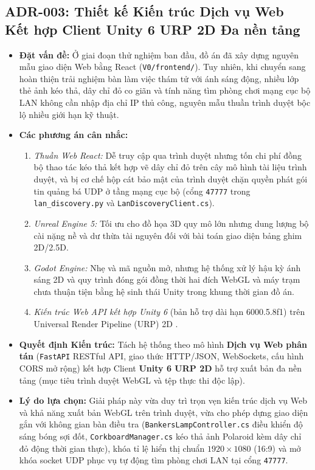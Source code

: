 \subsection{ADR-003: Thiết kế Kiến trúc Dịch vụ Web Kết hợp Client Unity 6 URP 2D Đa nền tảng}
\begin{itemize}[leftmargin=1.5cm]
    \item \textbf{Đặt vấn đề:} Ở giai đoạn thử nghiệm ban đầu, đồ án đã xây dựng nguyên mẫu giao diện Web bằng React (\texttt{V0/frontend/}). Tuy nhiên, khi chuyển sang hoàn thiện trải nghiệm bàn làm việc thám tử với ánh sáng động, nhiều lớp thẻ ảnh kéo thả, dây chỉ đỏ co giãn và tính năng tìm phòng chơi mạng cục bộ LAN không cần nhập địa chỉ IP thủ công, nguyên mẫu thuần trình duyệt bộc lộ nhiều giới hạn kỹ thuật.
    \item \textbf{Các phương án cân nhắc:}
    \begin{enumerate}
        \item \textit{Thuần Web React:} Dễ truy cập qua trình duyệt nhưng tốn chi phí đồng bộ thao tác kéo thả kết hợp vẽ dây chỉ đỏ trên cây mô hình tài liệu trình duyệt, và bị cơ chế hộp cát bảo mật của trình duyệt chặn quyền phát gói tin quảng bá UDP ở tầng mạng cục bộ (cổng \texttt{47777} trong \texttt{lan\_discovery.py} và \texttt{LanDiscoveryClient.cs}).
        \item \textit{Unreal Engine 5:} Tối ưu cho đồ họa 3D quy mô lớn nhưng dung lượng bộ cài nặng nề và dư thừa tài nguyên đối với bài toán giao diện bảng ghim 2D/2.5D.
        \item \textit{Godot Engine:} Nhẹ và mã nguồn mở, nhưng hệ thống xử lý hậu kỳ ánh sáng 2D và quy trình đóng gói đồng thời hai đích WebGL và máy trạm chưa thuận tiện bằng hệ sinh thái Unity trong khung thời gian đồ án.
        \item \textit{Kiến trúc Web API kết hợp Unity 6} (bản hỗ trợ dài hạn 6000.5.8f1) trên Universal Render Pipeline (URP) 2D \cite{unity2024urp}.
    \end{enumerate}
    \item \textbf{Quyết định Kiến trúc:} Tách hệ thống theo mô hình \textbf{Dịch vụ Web phân tán} (\texttt{FastAPI} RESTful API, giao thức HTTP/JSON, WebSockets, cấu hình CORS mở rộng) kết hợp Client \textbf{Unity 6 URP 2D} hỗ trợ xuất bản đa nền tảng (mục tiêu trình duyệt WebGL và tệp thực thi độc lập).
    \item \textbf{Lý do lựa chọn:} Giải pháp này vừa duy trì trọn vẹn kiến trúc dịch vụ Web và khả năng xuất bản WebGL trên trình duyệt, vừa cho phép dựng giao diện gắn với không gian bàn điều tra (\texttt{BankersLampController.cs} điều khiển độ sáng bóng sợi đốt, \texttt{CorkboardManager.cs} kéo thả ảnh Polaroid kèm dây chỉ đỏ động thời gian thực), khóa tỉ lệ hiển thị chuẩn $1920\times 1080$ (16:9) và mở khóa socket UDP phục vụ tự động tìm phòng chơi LAN tại cổng \texttt{47777}.
\end{itemize}

